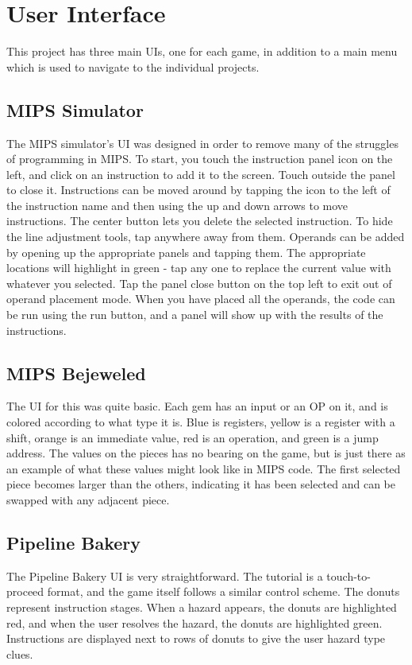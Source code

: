 \documentclass[12pt]{article}
\begin{document}
	\section{User Interface}
	This project has three main UIs, one for each game, in addition to a main menu which is used to navigate to the individual projects.
	\subsection{MIPS Simulator}
	The MIPS simulator's UI was designed in order to remove many of the struggles of programming in MIPS. To start, you touch the instruction panel icon on the left, and click on an instruction to add it to the screen. Touch outside the panel to close it. Instructions can be moved around by tapping the icon to the left of the instruction name and then using the up and down arrows to move instructions. The center button lets you delete the selected instruction. To hide the line adjustment tools, tap anywhere away from them. Operands can be added by opening up the appropriate panels and tapping them. The appropriate locations will highlight in green - tap any one to replace the current value with whatever you selected. Tap the panel close button on the top left to exit out of operand placement mode. When you have placed all the operands, the code can be run using the run button, and a panel will show up with the results of the instructions.
	\subsection{MIPS Bejeweled}
	The UI for this was quite basic. Each gem has an input or an OP on it, and is colored according to what type it is. Blue is registers, yellow is a register with a shift, orange is an immediate value, red is an operation, and green is a jump address. The values on the pieces has no bearing on the game, but is just there as an example of what these values might look like in MIPS code. The first selected piece becomes larger than the others, indicating it has been selected and can be swapped with any adjacent piece.
	\subsection{Pipeline Bakery}
	The Pipeline Bakery UI is very straightforward. The tutorial is a touch-to-proceed format, and the game itself follows a similar control scheme. The donuts represent instruction stages. When a hazard appears, the donuts are highlighted red, and when the user resolves the hazard, the donuts are highlighted green. Instructions are displayed next to rows of donuts to give the user hazard type clues.
\end{document}

